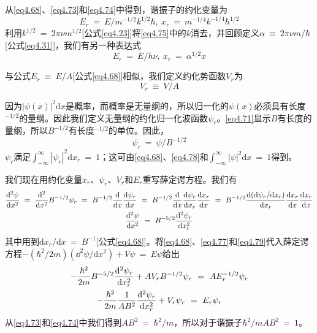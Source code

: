 \documentclass[12pt,a4paper,openany]{ctexbook}
\newcommand{\abs}[1]{\left| #1 \right|}
\newcommand{\dd}[1]{\mathrm{d} #1}
\begin{document}
\begin{flushleft}
从\eqref{eq4.68}、\eqref{eq4.73}和\eqref{eq4.74}中得到，谐振子的约化变量为
\begin{equation}
    E_r\ =\ E/m^{-1/2}k^{1/2}\hbar,\ x_r\ =\ m^{-1/4}k^{-1/4}\hbar^{1/2} \label{eq4.75}
\end{equation}
利用$k^{1/2}\ =\ 2\pi\nu m^{1/2}$[公式\eqref{eq4.23}]将\eqref{eq4.75}中的$k$消去，并回顾定义$\alpha\ \equiv\ 2\pi\nu m/\hbar$[公式\eqref{eq4.31}]，我们有另一种表达式
\begin{equation}
    E_r\ =\ E/h\nu,\ x_r\ =\ \alpha^{1/2}x \label{eq4.76}
\end{equation}

与公式$E_r\ \equiv\ E/A$[公式\eqref{eq4.68}]相似，我们定义约化势函数$V_r$为
\begin{equation}
    V_r\ \equiv\ V/A \label{eq4.77}
\end{equation}

因为$\abs{\psi(x)}^2\dd x$是概率，而概率是无量纲的，所以归一化的$\psi(x)$必须具有长度$^{-1/2}$的量纲。因此我们定义无量纲的约化归一化波函数$\psi_r$。\eqref{eq4.71}显示$B$有长度的量纲，所以$B^{-1/2}$有长度$^{-1/2}$的单位。因此，
\begin{equation}
    \psi_r\ =\ \psi/B^{-1/2} \label{eq4.78}
\end{equation}
$\psi_r$满足$\int_{-\infty}^{\infty}\abs{\psi_r}^2\dd x_r\ =\ 1$；这可由\eqref{eq4.68}、\eqref{eq4.78}和$\int_{-\infty}^{\infty}\abs{\psi}^2\dd x\ =\ 1$得到。

我们现在用约化变量$x_r$、$\psi_r$、$V_r$和$E_r$重写薛定谔方程。我们有
\begin{gather}
    \frac{\dd^2\psi}{\dd x^2}\ =\ \frac{\dd^2}{\dd x^2}B^{-1/2}\psi_r\ =\ B^{-1/2}\frac{\dd}{\dd x}\frac{\dd\psi_r}{\dd x}\ =\ B^{-1/2}\frac{\dd}{\dd x}\frac{\dd\psi_r}{\dd x_r}\frac{\dd x_r}{\dd x}\ =\ B^{-1/2}\frac{\dd(\dd \psi_r/\dd x_r)}{\dd x_r}\frac{\dd x_r}{\dd x}\frac{\dd x_r}{\dd x} \notag \\
    \frac{\dd^2\psi}{\dd x^2}\ =\ B^{-5/2}\frac{\dd^2\psi_r}{\dd x_r^2} \label{eq4.79}
\end{gather}
其中用到$\dd x_r/\dd x\ =\ B^{-1}$[公式\eqref{eq4.68}]。将\eqref{eq4.68}、\eqref{eq4.77}和\eqref{eq4.79}代入薛定谔方程$-(\hbar^2/2m)(\dd^2\psi/\dd x^2)+V\psi\ =\ E\psi$给出
\begin{gather}
    -\frac{\hbar^2}{2m}B^{-5/2}\frac{\dd^2\psi_r}{\dd x_r^2}+AV_rB^{-1/2}\psi_r\ =\ AE_r^{-1/2}\psi_r \notag \\
    -\frac{\hbar^2}{2m}\frac{1}{AB^2}\frac{\dd^2\psi_r}{\dd x_r^2}+V_r\psi_r\ =\ E_r\psi_r \label{eq4.80}
\end{gather}
从\eqref{eq4.73}和\eqref{eq4.74}中我们得到$AB^2\ =\ \hbar^2/m$，所以对于谐振子$\hbar^2/mAB^2\ =\ 1$。


\end{flushleft}
\end{document}
